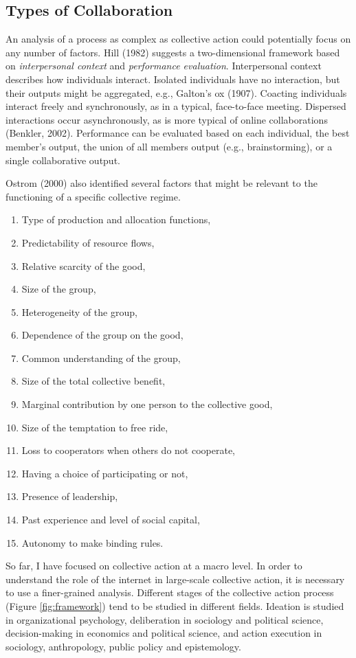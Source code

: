 \subsection{Types of Collaboration}
An analysis of a process as complex as collective action could potentially focus on any number of factors. Hill (1982) suggests a two-dimensional framework based on {\em interpersonal context} and {\em performance evaluation}. Interpersonal context describes how individuals interact. Isolated individuals have no interaction, but their outputs might be aggregated, e.g., Galton's ox (1907). Coacting individuals interact freely and synchronously, as in a typical, face-to-face meeting. Dispersed interactions occur asynchronously, as is more typical of online collaborations (Benkler, 2002). Performance can be evaluated based on each individual, the best member's output, the union of all members output (e.g., brainstorming), or a single collaborative output.

Ostrom (2000) also identified several factors that might be relevant to the functioning of a specific collective regime.
\begin{enumerate}
\item{Type of production and allocation functions,}
\item{Predictability of resource flows,}
\item{Relative scarcity of the good,}
\item{Size of the group,}
\item{Heterogeneity of the group,}
\item{Dependence of the group on the good,}
\item{Common understanding of the group,}
\item{Size of the total collective benefit,}
\item{Marginal contribution by one person to the collective good,}
\item{Size of the temptation to free ride,}
\item{Loss to cooperators when others do not cooperate,}
\item{Having a choice of participating or not,}
\item{Presence of leadership,}
\item{Past experience and level of social capital,}
\item{Autonomy to make binding rules.}
\end{enumerate}
 
So far, I have focused on collective action at a macro level. In order to understand the role of the internet in large-scale collective action, it is necessary to use a finer-grained analysis. Different stages of the collective action process (Figure \ref{fig:framework}) tend to be studied in different fields. Ideation is studied in organizational psychology, deliberation in sociology and political science, decision-making in economics and political science, and action execution in sociology, anthropology, public policy and epistemology.

